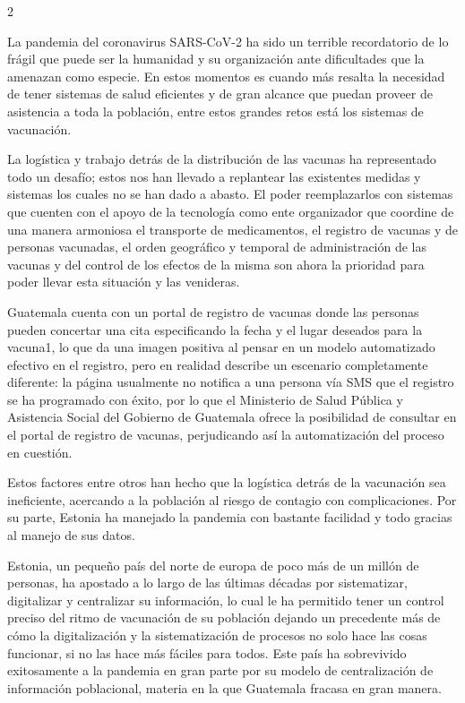 \documentclass[12pt,spanish,Letterpaper,openany]{book}
\begin{document}
\begin {multicols}{2}

La pandemia del coronavirus SARS-CoV-2 ha sido un terrible recordatorio de lo frágil que puede
ser la humanidad y su organización ante dificultades que la amenazan como especie. En estos
momentos es cuando más resalta la necesidad de tener sistemas de salud eficientes y de gran
alcance que puedan proveer de asistencia a toda la población, entre estos grandes retos está los
sistemas de vacunación.

La logística y trabajo detrás de la distribución de las vacunas ha representado todo un desafío;
estos nos han llevado a replantear las existentes medidas y sistemas los cuales no se han dado a
abasto. El poder reemplazarlos con sistemas que cuenten con el apoyo de la tecnología como
ente organizador que coordine de una manera armoniosa el transporte de medicamentos, el
registro de vacunas y de personas vacunadas, el orden geográfico y temporal de administración
de las vacunas y del control de los efectos de la misma son ahora la prioridad para poder llevar
esta situación y las venideras.

Guatemala cuenta con un portal de registro de vacunas donde las personas pueden concertar una
cita especificando la fecha y el lugar deseados para la vacuna1, lo que da una imagen positiva al
pensar en un modelo automatizado efectivo en el registro, pero en realidad describe un escenario
completamente diferente: la página usualmente no notifica a una persona vía SMS que el registro
se ha programado con éxito, por lo que el Ministerio de Salud Pública y Asistencia Social del
Gobierno de Guatemala ofrece la posibilidad de consultar en el portal de registro de vacunas,
perjudicando así la automatización del proceso en cuestión.

Estos factores entre otros han hecho que la logística detrás de la vacunación sea ineficiente,
acercando a la población al riesgo de contagio con complicaciones. Por su parte, Estonia ha
manejado la pandemia con bastante facilidad y todo gracias al manejo de sus datos.

Estonia, un pequeño país del norte de europa de poco más de un millón de personas, ha apostado
a lo largo de las últimas décadas por sistematizar, digitalizar y centralizar su información, lo cual
le ha permitido tener un control preciso del ritmo de vacunación de su población dejando un
precedente más de cómo la digitalización y la sistematización de procesos no solo hace las cosas
funcionar, si no las hace más fáciles para todos. Este país ha sobrevivido exitosamente a la
pandemia en gran parte por su modelo de centralización de información poblacional, materia en
la que Guatemala fracasa en gran manera.


\end{multicols}
\end{document}
